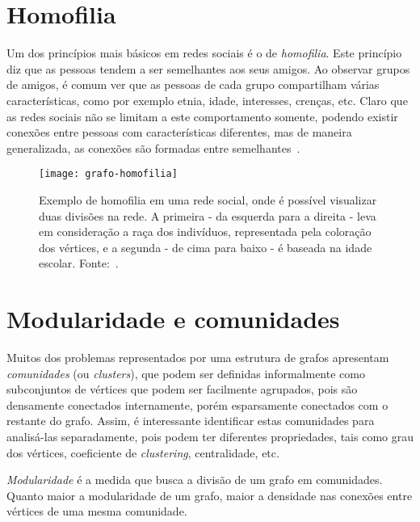 \section{Homofilia}
\label{conceitos__homofilia}

Um dos princípios mais básicos em redes sociais é o de \emph{homofilia}. Este princípio diz que as pessoas tendem a ser semelhantes aos seus amigos. Ao observar grupos de amigos, é comum ver que as pessoas de cada grupo compartilham várias características, como por exemplo etnia, idade, interesses, crenças, etc. Claro que as redes sociais não se limitam a este comportamento somente, podendo existir conexões entre pessoas com características diferentes, mas de maneira generalizada, as conexões são formadas entre semelhantes~\cite{easley2010networks}.

\begin{figure}[H]
\texttt{[image: grafo-homofilia]}
\centering
\caption{
     Exemplo de homofilia em uma rede social, onde é possível visualizar duas divisões na rede. A primeira - da esquerda para a direita - leva em consideração a raça dos indivíduos, representada pela coloração dos vértices, e a segunda - de cima para baixo - é baseada na idade escolar. Fonte:~\cite{moody2001race}.
}
\label{fig:grafo-homofilia}
\end{figure}

\section{Modularidade e comunidades}
\label{conceitos__modularidade}

Muitos dos problemas representados por uma estrutura de grafos apresentam \emph{comunidades} (ou \emph{clusters}), que podem ser definidas informalmente como subconjuntos de vértices que podem ser facilmente agrupados, pois são densamente conectados internamente, porém esparsamente conectados com o restante do grafo. Assim, é interessante identificar estas comunidades para analisá-las separadamente, pois podem ter diferentes propriedades, tais como grau dos vértices, coeficiente de \emph{clustering}, centralidade, etc. 

\emph{Modularidade} é a medida que busca a divisão de um grafo em comunidades. Quanto maior a modularidade de um grafo, maior a densidade nas conexões entre vértices de uma mesma comunidade.

